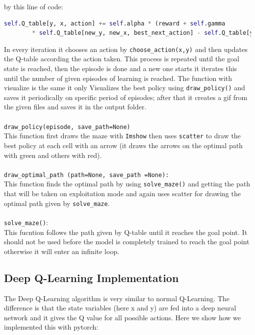 \documentclass[11pt]{article}
\begin{document}
by this line of code:
\begin{lstlisting}[language=Python]
    self.Q_table[y, x, action] += self.alpha * (reward + self.gamma 
        * self.Q_table[new_y, new_x, best_next_action] - self.Q_table[y, x, action])
\end{lstlisting}
In every iteration it chooses an action by \texttt{choose\_action(x,y)} and then updates the Q-table
according the action taken. This process is repeated until the goal state is reached, then the episode is done
and a new one starts it iterates this until the number of given episodes of learning is reached. The function with
visualize is the same it only Visualizes the best policy using \texttt{draw\_policy()} and saves it periodically
on specific period of episodes; after that it creates a gif from the given files and saves it in the output folder.
\\ \\
\texttt{draw\_policy(episode, save\_path=None)} \\
This function first draws the maze with \texttt{Imshow} then uses \texttt{scatter} to draw the
best policy at each cell with an arrow (it draws the arrows on the optimal path with green and others with red).
\\ \\
\texttt{draw\_optimal\_path (path=None, save\_path =None):} \\
This function finds the optimal path by using \texttt{solve\_maze()} and getting the path
that will be taken on exploitation mode and again uses scatter for drawing the optimal path given by \texttt{solve\_maze}.
\\ \\
\texttt{solve\_maze()}: \\
This fucntion follows the path given by Q-table until it reaches the goal point. It should
not be used before the model is completely trained to reach the goal point otherwise it will enter
an infinite loop.


\subsection{Deep Q-Learning Implementation}
The Deep Q-Learning algorithm is very similar to normal Q-Learning. The difference is that
the state variables (here x and y) are fed into a deep neural network and it gives the Q value for all
possible actions. Here we show how we implemented this with pytorch: \\
\end{document}
